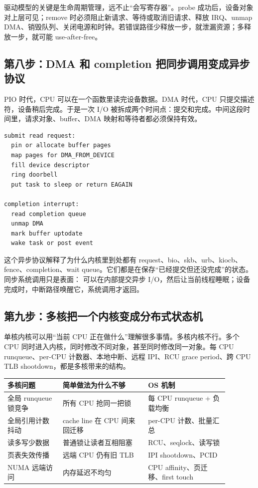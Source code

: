 驱动模型的关键是生命周期管理，远不止“会写寄存器”。probe 成功后，设备对象对上层可见；remove 时必须阻止新请求、等待或取消旧请求、释放 IRQ、unmap DMA、销毁队列、关闭电源和时钟。若错误路径少释放一步，就泄漏资源；多释放一步，就可能 use-after-free。

\subsection{第八步：DMA 和 completion 把同步调用变成异步协议}

PIO 时代，CPU 可以在一个函数里读完设备数据。DMA 时代，CPU 只提交描述符，设备稍后完成。于是一次 I/O 被拆成两个时间点：提交和完成。中间这段时间里，请求对象、buffer、DMA 映射和等待者都必须保持有效。

\begin{lstlisting}
submit read request:
  pin or allocate buffer pages
  map pages for DMA_FROM_DEVICE
  fill device descriptor
  ring doorbell
  put task to sleep or return EAGAIN

completion interrupt:
  read completion queue
  unmap DMA
  mark buffer uptodate
  wake task or post event
\end{lstlisting}

这个异步协议解释了为什么内核里到处都有 request、bio、skb、urb、kiocb、fence、completion、wait queue。它们都是在保存“已经提交但还没完成”的状态。同步系统调用只是表面： 可以在内部提交异步 I/O，然后让当前线程睡眠；设备完成时，中断路径唤醒它，系统调用才返回。

\subsection{第九步：多核把一个内核变成分布式状态机}

单核内核可以用“当前 CPU 正在做什么”理解很多事情。多核内核不行。多个 CPU 同时进入内核，同时修改不同对象，甚至同时修改同一对象。每 CPU runqueue、per-CPU 计数器、本地中断、远程 IPI、RCU grace period、跨 CPU TLB shootdown，都是多核带来的结构。

\begin{longtable}{p{0.22\linewidth}p{0.34\linewidth}p{0.32\linewidth}}
\toprule
多核问题 & 简单做法为什么不够 & OS 机制 \\
\midrule
全局 runqueue 锁竞争 & 所有 CPU 抢同一把锁 & 每 CPU runqueue + 负载均衡 \\
全局引用计数抖动 & cache line 在 CPU 间来回迁移 & per-CPU 计数、批量汇总 \\
读多写少数据 & 普通锁让读者互相阻塞 & RCU、seqlock、读写锁 \\
页表失效传播 & 远端 CPU 仍有旧 TLB & IPI shootdown、PCID \\
NUMA 远端访问 & 内存延迟不均匀 & CPU affinity、页迁移、first touch \\
\bottomrule
\end{longtable}

